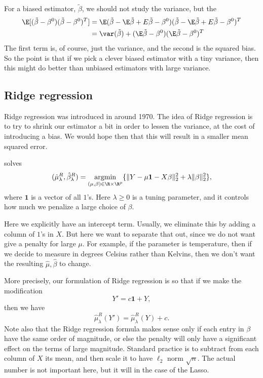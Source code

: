 \documentclass[a4paper]{article}
\DeclareMathOperator*\argmin{argmin}
\begin{document}
For a biased estimator, $\tilde{\beta}$, we should not study the variance, but the 
\begin{align*}
  \E[(\tilde{\beta} - \beta^0)(\tilde{\beta} - \beta^0)^T]
  &= \E(\tilde{\beta} - \E \tilde{\beta} + E \tilde{\beta} - \beta^0)(\tilde{\beta} - \E \tilde{\beta} + E \tilde{\beta} - \beta^0)^T \\ &= \var(\tilde{\beta})+ (\E \tilde{\beta} - \beta^0)(\E \tilde{\beta} - \beta^0)^T
\end{align*}
The first term is, of course, just the variance, and the second is the squared bias. So the point is that if we pick a clever biased estimator with a tiny variance, then this might do better than unbiased estimators with large variance.

\subsection{Ridge regression}
Ridge regression was introduced in around 1970. The idea of Ridge regression is to try to shrink our estimator a bit in order to lessen the variance, at the cost of introducing a bias. We would hope then that this will result in a smaller mean squared error.

\begin{defi}
   solves
  \[
    (\hat{\mu}^R_\lambda, \hat{\beta}^R_\lambda) = \argmin_{(\mu, \beta) \in \R \times \R^p} \{ \|Y - \mu \mathbf{1} - X \beta\|_2^2 + \lambda \|\beta\|_2^2\},
  \]
  where $\mathbf{1}$ is a vector of all $1$'s. Here $\lambda \geq 0$ is a tuning parameter, and it controls how much we penalize a large choice of $\beta$.
\end{defi}

Here we explicitly have an intercept term. Usually, we eliminate this by adding a column of $1$'s in $X$. But here we want to separate that out, since we do not want give a penalty for large $\mu$. For example, if the parameter is temperature, then if we decide to measure in degrees Celsius rather than Kelvins, then we don't want the resulting $\hat{\mu}, \hat{\beta}$ to change.

More precisely, our formulation of Ridge regression is so that if we make the modification
\[
  Y' = c\mathbf{1} + Y,
\]
then we have
\[
  \hat{\mu}^R_\lambda(Y') = \hat{\mu}_\lambda^R(Y) + c.
\]
Note also that the Ridge regression formula makes sense only if each entry in $\beta$ have the same order of magnitude, or else the penalty will only have a significant effect on the terms of large magnitude. Standard practice is to subtract from each column of $X$ its mean, and then scale it to have $\ell_2$ norm $\sqrt{n}$. The actual number is not important here, but it will in the case of the Lasso.
\end{document}
